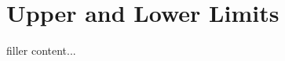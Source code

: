 \documentclass[../../templates/section]{subfiles}
\begin{document}
\section{Upper and Lower Limits}\label{sec:upper-and-lower-limits}

filler content...
\end{document}
